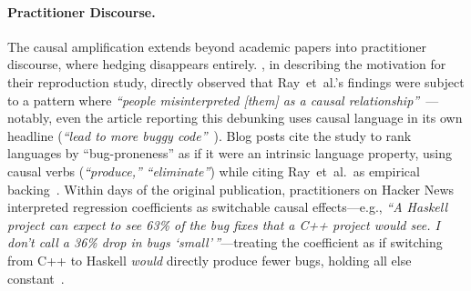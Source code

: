 \paragraph{Practitioner Discourse.}
The causal amplification extends beyond academic papers into practitioner discourse, where hedging disappears entirely.
\citeauthor{DBLP:journals/toplas/BergerHMVV19}, in describing the motivation for their reproduction study, directly observed that Ray~et~al.'s findings were subject to a pattern where \emph{``people misinterpreted [them] as a causal relationship''}~\cite{claburn2019register}---notably, even the article reporting this debunking uses causal language in its own headline (\emph{``lead to more buggy code''}~\cite{claburn2019register}).
Blog posts cite the study to rank languages by ``bug-proneness'' as if it were an intrinsic language property, using causal verbs (\emph{``produce,''} \emph{``eliminate''}) while citing Ray~et~al.\ as empirical backing~\cite{huang2021bugprone}.
Within days of the original publication, practitioners on Hacker News interpreted regression coefficients as switchable causal effects---e.g., \emph{``A Haskell project can expect to see 63\% of the bug fixes that a C++ project would see.
I don't call a 36\% drop in bugs `small'\,''}---treating the coefficient as if switching from C++ to Haskell \emph{would} directly produce fewer bugs, holding all else constant~\cite{hn2014rayetal}.


